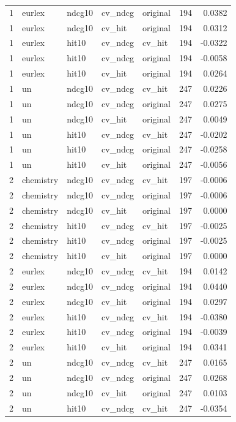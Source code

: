\begin{tabular}{rllllrr}
1 & eurlex & ndcg10 & cv\_ndcg & original & 194 & 0.0382 \\
1 & eurlex & ndcg10 & cv\_hit & original & 194 & 0.0312 \\
1 & eurlex & hit10 & cv\_ndcg & cv\_hit & 194 & -0.0322 \\
1 & eurlex & hit10 & cv\_ndcg & original & 194 & -0.0058 \\
1 & eurlex & hit10 & cv\_hit & original & 194 & 0.0264 \\
1 & un & ndcg10 & cv\_ndcg & cv\_hit & 247 & 0.0226 \\
1 & un & ndcg10 & cv\_ndcg & original & 247 & 0.0275 \\
1 & un & ndcg10 & cv\_hit & original & 247 & 0.0049 \\
1 & un & hit10 & cv\_ndcg & cv\_hit & 247 & -0.0202 \\
1 & un & hit10 & cv\_ndcg & original & 247 & -0.0258 \\
1 & un & hit10 & cv\_hit & original & 247 & -0.0056 \\
2 & chemistry & ndcg10 & cv\_ndcg & cv\_hit & 197 & -0.0006 \\
2 & chemistry & ndcg10 & cv\_ndcg & original & 197 & -0.0006 \\
2 & chemistry & ndcg10 & cv\_hit & original & 197 & 0.0000 \\
2 & chemistry & hit10 & cv\_ndcg & cv\_hit & 197 & -0.0025 \\
2 & chemistry & hit10 & cv\_ndcg & original & 197 & -0.0025 \\
2 & chemistry & hit10 & cv\_hit & original & 197 & 0.0000 \\
2 & eurlex & ndcg10 & cv\_ndcg & cv\_hit & 194 & 0.0142 \\
2 & eurlex & ndcg10 & cv\_ndcg & original & 194 & 0.0440 \\
2 & eurlex & ndcg10 & cv\_hit & original & 194 & 0.0297 \\
2 & eurlex & hit10 & cv\_ndcg & cv\_hit & 194 & -0.0380 \\
2 & eurlex & hit10 & cv\_ndcg & original & 194 & -0.0039 \\
2 & eurlex & hit10 & cv\_hit & original & 194 & 0.0341 \\
2 & un & ndcg10 & cv\_ndcg & cv\_hit & 247 & 0.0165 \\
2 & un & ndcg10 & cv\_ndcg & original & 247 & 0.0268 \\
2 & un & ndcg10 & cv\_hit & original & 247 & 0.0103 \\
2 & un & hit10 & cv\_ndcg & cv\_hit & 247 & -0.0354 \\

\end{tabular}
